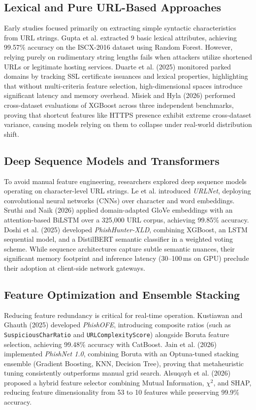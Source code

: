 \documentclass[journal]{IEEEtran}
\begin{document}
\subsection{Lexical and Pure URL-Based Approaches}
Early studies focused primarily on extracting simple syntactic characteristics from URL strings. Gupta et al. \cite{gupta2017} extracted 9 basic lexical attributes, achieving 99.57\% accuracy on the ISCX-2016 dataset using Random Forest. However, relying purely on rudimentary string lengths fails when attackers utilize shortened URLs or legitimate hosting services. Duarte et al. (2025) \cite{duarte2025} monitored parked domains by tracking SSL certificate issuances and lexical properties, highlighting that without multi-criteria feature selection, high-dimensional spaces introduce significant latency and memory overhead. Misiek and Hyla (2026) \cite{misiek2026} performed cross-dataset evaluations of XGBoost across three independent benchmarks, proving that shortcut features like HTTPS presence exhibit extreme cross-dataset variance, causing models relying on them to collapse under real-world distribution shift.

\subsection{Deep Sequence Models and Transformers}
To avoid manual feature engineering, researchers explored deep sequence models operating on character-level URL strings. Le et al. \cite{le2018urlnet} introduced \emph{URLNet}, deploying convolutional neural networks (CNNs) over character and word embeddings. Sruthi and Naik (2026) \cite{sruthi2026} applied domain-adapted GloVe embeddings with an attention-based BiLSTM over a 325,000 URL corpus, achieving 99.85\% accuracy. Doshi et al. (2025) \cite{doshi2025} developed \emph{PhishHunter-XLD}, combining XGBoost, an LSTM sequential model, and a DistilBERT semantic classifier in a weighted voting scheme. While sequence architectures capture subtle semantic nuances, their significant memory footprint and inference latency (30--100\,ms on GPU) preclude their adoption at client-side network gateways.

\subsection{Feature Optimization and Ensemble Stacking}
Reducing feature redundancy is critical for real-time operation. Kustiawan and Ghauth (2025) \cite{kustiawan2025} developed \emph{PhishOFE}, introducing composite ratios (such as \texttt{SuspiciousCharRatio} and \texttt{URLComplexityScore}) alongside Boruta feature selection, achieving 99.48\% accuracy with CatBoost. Jain et al. (2026) \cite{jain2026} implemented \emph{PhishNet 1.0}, combining Boruta with an Optuna-tuned stacking ensemble (Gradient Boosting, KNN, Decision Tree), proving that metaheuristic tuning consistently outperforms manual grid search. Alsuqayh et al. (2026) \cite{alsuqayh2026} proposed a hybrid feature selector combining Mutual Information, $\chi^2$, and SHAP, reducing feature dimensionality from 53 to 10 features while preserving 99.9\% accuracy.
\end{document}
